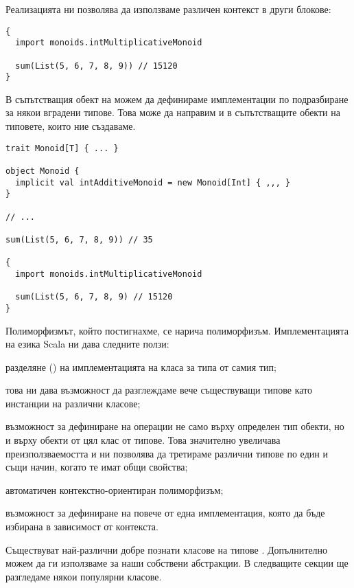 Реализацията ни позволява да използваме различен контекст в други блокове:

\begin{lstlisting}
{
  import monoids.intMultiplicativeMonoid
  
  sum(List(5, 6, 7, 8, 9)) // 15120
}
\end{lstlisting}

В съпътстващия обект на  можем да дефинираме имплементации по подразбиране за някои вградени типове. Това може да направим и в съпътстващите обекти на типовете, които ние създаваме.

\begin{lstlisting}
trait Monoid[T] { ... }

object Monoid {
  implicit val intAdditiveMonoid = new Monoid[Int] { ,,, }
}

// ...

sum(List(5, 6, 7, 8, 9)) // 35

{
  import monoids.intMultiplicativeMonoid
  
  sum(List(5, 6, 7, 8, 9) // 15120
}
\end{lstlisting}

Полиморфизмът, който постигнахме, се нарича  полиморфизъм. Имплементацията на езика Scala ни дава следните ползи:

\begin{itemize*}
  \item разделяне () на имплементацията на класа за типа от самия тип;
  \item това ни дава възможност да разглеждаме вече съществуващи типове като инстанции на различни класове;
  \item възможност за дефиниране на операции не само върху определен тип обекти, но и върху обекти от цял клас от типове. Това значително увеличава преизползваемостта и ни позволява да третираме различни типове по един и същи начин, когато те имат общи свойства;
  \item автоматичен контекстно-ориентиран полиморфизъм;
  \item възможност за дефиниране на повече от една имплементация, която да бъде избирана в зависимост от контекста.
\end{itemize*}

Съществуват най-различни добре познати класове на типове \cite{yorget2009Typeclasses}. Допълнително можем да ги използваме за наши собствени абстракции. В следващите секции ще разгледаме някои популярни класове.

